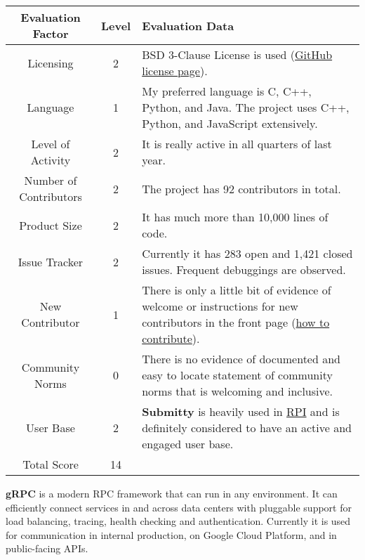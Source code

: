 \documentclass[11pt]{article}
\begin{document}
\begin{tabular}{|c|c|p{4in}|} 
\hline
Evaluation Factor & Level & Evaluation Data \\
\hline
Licensing & 2 & BSD 3-Clause License is used (\href{https://github.com/Submitty/Submitty/blob/master/LICENSE.md}{GitHub license page}).\\
\hline
Language & 1 & My preferred language is C, C++, Python, and Java. The project uses C++, Python, and JavaScript extensively.\\
\hline
Level of Activity & 2 & It is really active in all quarters of last year.\\
\hline
Number of Contributors & 2 & The project has 92 contributors in total.\\
\hline
Product Size & 2 & It has much more than 10,000 lines of code.\\
\hline
Issue Tracker & 2 & Currently it has 283 open and 1,421 closed issues. Frequent debuggings are observed.\\
\hline
New Contributor & 1 & There is only a little bit of evidence of welcome or instructions for new contributors in the front page (\href{https://submitty.org/developer/how_to_contribute}{how to contribute}).\\
\hline
Community Norms & 0 & There is no evidence of documented and easy to locate statement of community norms that is welcoming and inclusive.\\
\hline
User Base & 2 & \textbf{Submitty} is heavily used in \href{https://www.rpi.edu}{RPI} and is definitely considered to have an active and engaged user base.\\
\hline
Total Score & 14 & \\
\hline
\end{tabular}

\textbf{gRPC} is a modern RPC framework that can run in any environment. It can efficiently connect services in and across data centers with pluggable support for load balancing, tracing, health checking and authentication. Currently it is used for communication in internal production, on Google Cloud Platform, and in public-facing APIs.
\end{document}
